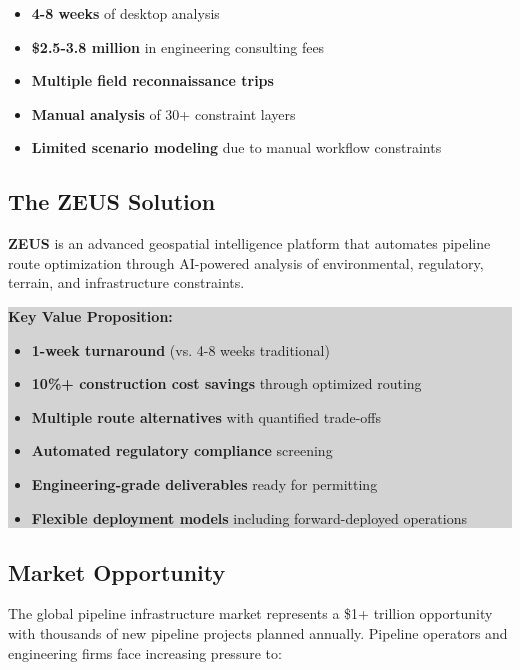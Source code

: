 \documentclass[11pt,letterpaper]{article}
\begin{document}
\begin{itemize}[leftmargin=*]
    \item \textbf{4-8 weeks} of desktop analysis
    \item \textbf{\$2.5-3.8 million} in engineering consulting fees
    \item \textbf{Multiple field reconnaissance trips}
    \item \textbf{Manual analysis} of 30+ constraint layers
    \item \textbf{Limited scenario modeling} due to manual workflow constraints
\end{itemize}

\subsection{The ZEUS Solution}

\textbf{ZEUS} is an advanced geospatial intelligence platform that automates pipeline route optimization through AI-powered analysis of environmental, regulatory, terrain, and infrastructure constraints.

\vspace{0.3cm}

\noindent\colorbox{lightgray}{\parbox{\dimexpr\textwidth-2\fboxsep}{%
\textbf{Key Value Proposition:}
\begin{itemize}[leftmargin=*,nosep]
    \item \textbf{1-week turnaround} (vs. 4-8 weeks traditional)
    \item \textbf{10\%+ construction cost savings} through optimized routing
    \item \textbf{Multiple route alternatives} with quantified trade-offs
    \item \textbf{Automated regulatory compliance} screening
    \item \textbf{Engineering-grade deliverables} ready for permitting
    \item \textbf{Flexible deployment models} including forward-deployed operations
\end{itemize}
}}

\subsection{Market Opportunity}

The global pipeline infrastructure market represents a \$1+ trillion opportunity with thousands of new pipeline projects planned annually. Pipeline operators and engineering firms face increasing pressure to:
\end{document}

